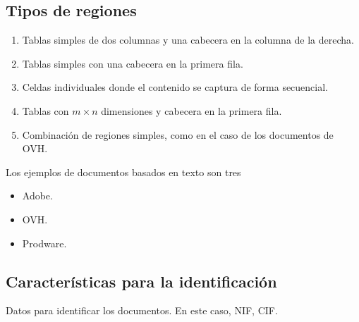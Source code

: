 \subsection{Tipos de regiones}

\begin{enumerate}
	\item Tablas simples de dos columnas y una cabecera en la columna de la derecha.
	\item Tablas simples con una cabecera en la primera fila.
	\item Celdas individuales donde el contenido se captura de forma secuencial.
	\item Tablas con $m\times n$ dimensiones y cabecera en la primera fila.
	\item Combinación de regiones simples, como en el caso de los documentos de OVH.
\end{enumerate}

Los ejemplos de documentos basados en texto son tres

\begin{itemize}
	\item Adobe.
	\item OVH.
	\item Prodware.
\end{itemize}



\subsection{Características para la identificación}

Datos para identificar los documentos. En este caso, NIF, CIF.


